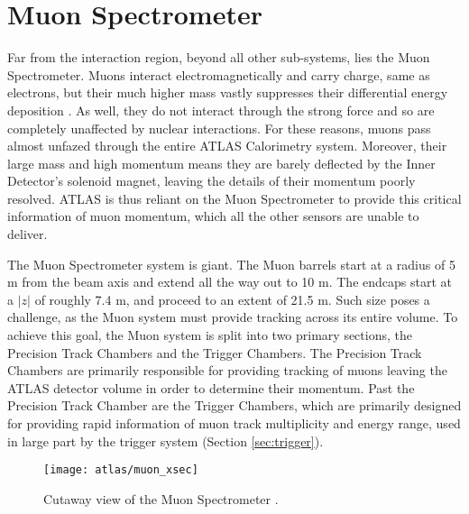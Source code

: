     


\section{Muon Spectrometer} \label{sec:muon}

    Far from the interaction region, beyond all other sub-systems, lies the Muon Spectrometer.
    Muons interact electromagnetically and carry charge, same as electrons,
        but their much higher mass vastly suppresses their differential energy deposition \cite{wiley_radiation_detection}.
    As well, they do not interact through the strong force and so are completely unaffected by nuclear interactions.
    For these reasons, muons pass almost unfazed through the entire ATLAS Calorimetry system.
    Moreover, their large mass and high momentum means they are barely deflected by the Inner Detector's solenoid magnet,
        leaving the details of their momentum poorly resolved.
    ATLAS is thus reliant on the Muon Spectrometer to provide this critical information of muon momentum,
        which all the other sensors are unable to deliver.

    The Muon Spectrometer system is giant.
    The Muon barrels start at a radius of 5 m from the beam axis and extend all the way out to 10 m.
    The endcaps start at a $|z|$ of roughly 7.4 m, and proceed to an extent of 21.5 m.
    Such size poses a challenge, as the Muon system must provide tracking across its entire volume.
    To achieve this goal, the Muon system is split into two primary sections, the Precision Track Chambers and the Trigger Chambers.
    The Precision Track Chambers are primarily responsible for providing tracking
        of muons leaving the ATLAS detector volume in order to determine their momentum.
    Past the Precision Track Chamber are the Trigger Chambers, which are primarily designed for providing rapid information of muon track multiplicity and energy range, used in large part by the trigger system (Section \ref{sec:trigger}).

    \begin{figure}\centering
        \texttt{[image: atlas/muon\_xsec]}
        \caption{Cutaway view of the Muon Spectrometer \cite{atlas_tdr}.}
        \label{fig:muon_xsec}
    \end{figure}

